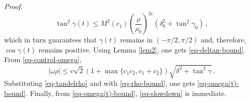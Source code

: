 \documentclass[10pt,a4paper]{amsart}
\renewenvironment{proof}[1][Proof]{\par\pushQED{\qed}\normalfont\textit{#1.}~}{\popQED\par}
\begin{document}
\begin{proof}
\begin{equation}
\tan^2\gamma(t) \leq M^2(c_1)\left(\frac{\rho}{\rho_0}\right)^{2\underline c} ( \delta^2_0+\tan^2\gamma_0)\,,
\end{equation}
which in turn guarantees that $\gamma(t)$ remains in $(-\pi/2,\pi/2)$ and, therefore, $\cos\gamma(t)$ remains positive. 
Using Lemma \ref{lem2}, one gets \eqref{eq-deltan-bound}. From \eqref{eq-control-omega}, 
\begin{equation}
|\omega\rho| \leq v\sqrt{2}(1+\max\{c_1c_2,c_1+c_2\})\sqrt{\delta^2+\tan^2\gamma}\,.
\end{equation}
Substituting \eqref{eq-tandelrho} and with \eqref{eq-rho-bound}, one gets 
\eqref{eq-omega(t)-bound}. Finally, from \eqref{eq-omega(t)-bound}, 
\eqref{eq-slowdown} is immediate. 
\end{proof}
\end{document}
